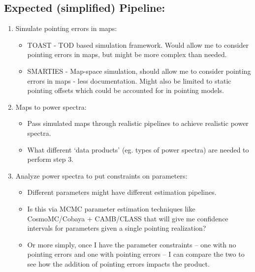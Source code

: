 \subsection{Expected (simplified) Pipeline:}
\begin{enumerate}
    \item Simulate pointing errors in maps: \begin{itemize}
        \item TOAST - TOD based simulation framework. Would allow me to consider pointing errors in maps, but might be more complex than needed.
        \item SMARTIES - Map-space simulation, should allow me to consider pointing errors in maps - less documentation. Might also be limited to static pointing offsets which could be accounted for in pointing models.
    \end{itemize}
    \item Maps to power spectra:\begin{itemize}
        \item Pass simulated maps through realistic pipelines to achieve realistic power spectra.
        \item What different `data products' (eg. types of power spectra) are needed to perform step 3.
    \end{itemize}
    \item Analyze power spectra to put constraints on parameters:\begin{itemize}
        \item Different parameters might have different estimation pipelines.
        \item Is this via MCMC parameter estimation techniques like CosmoMC/Cobaya + CAMB/CLASS that will give me confidence intervals for parameters given a single pointing realization?
        \item Or more simply, once I have the parameter constraints -- one with no pointing errors and one with pointing errors -- I can compare the two to see how the addition of pointing errors impacts the product. 
    \end{itemize}
\end{enumerate}


